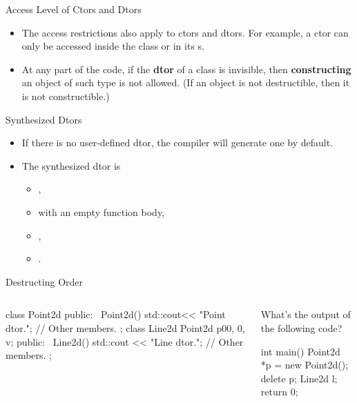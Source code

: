 \documentclass{beamer}
\begin{document}
\begin{frame}{Access Level of Ctors and Dtors}
    \begin{itemize}
        \item The access restrictions also apply to ctors and dtors. For example, a  ctor can only be accessed inside the class or in its s.
        \item At any part of the code, if the \textbf{dtor} of a class is invisible, then \textbf{constructing} an object of such type is not allowed. (If an object is not destructible, then it is not constructible.)
    \end{itemize}
\end{frame}

\begin{frame}{Synthesized Dtors}
    \begin{itemize}
        \item If there is no user-defined dtor, the compiler will generate one by default.
        \item The synthesized dtor is
        \begin{itemize}
            \item {},
            \item with an empty function body,
            \item {},
            \item {}.
        \end{itemize}
    \end{itemize}
\end{frame}

\begin{frame}[fragile]{Destructing Order}
    \begin{columns}
        \begin{column}{0.5\linewidth}
            \begin{cpp}
class Point2d {
 public:
  ~Point2d() {
    std::cout<< "Point dtor.\n";
  }
  // Other members.
};
class Line2d {
  Point2d p0{0, 0}, v; 
 public:
  ~Line2d() {
    std::cout << "Line dtor.\n";
  }
  // Other members.
};
            \end{cpp}
        \end{column}
        \begin{column}{0.5\linewidth}
            What's the output of the following code?
            \begin{cpp}
int main() {
  Point2d *p = new Point2d();
  delete p;
  Line2d l;
  return 0;
}
            \end{cpp}
        \end{column}
    \end{columns}
\end{frame}
\end{document}
